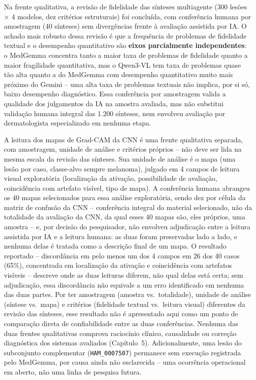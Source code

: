 Na frente qualitativa, a revisão de fidelidade das sínteses multiagente (300 lesões $\times$ 4 modelos, dez critérios estruturais) foi concluída, com conferência humana por amostragem (40 sínteses) sem divergências frente à avaliação assistida por IA. O achado mais robusto dessa revisão é que a frequência de problemas de fidelidade textual e o desempenho quantitativo são \textbf{eixos parcialmente independentes}: o MedGemma concentra tanto a maior taxa de problemas de fidelidade quanto a maior fragilidade quantitativa, mas o Qwen3-VL tem taxa de problemas quase tão alta quanto a do MedGemma com desempenho quantitativo muito mais próximo do Gemini -- uma alta taxa de problemas textuais não implica, por si só, baixo desempenho diagnóstico. Essa conferência por amostragem valida a qualidade dos julgamentos da IA na amostra avaliada, mas não substitui validação humana integral das 1.200 sínteses, nem envolveu avaliação por dermatologista especializado em nenhuma etapa.

A leitura dos mapas de Grad-CAM da CNN é uma frente qualitativa separada, com amostragem, unidade de análise e critérios próprios -- não deve ser lida na mesma escala da revisão das sínteses. Sua unidade de análise é o mapa (uma lesão por caso, classe-alvo sempre melanoma), julgado em 4 campos de leitura visual exploratória (localização da ativação, possibilidade de avaliação, coincidência com artefato visível, tipo de mapa). A conferência humana abrangeu os 40 mapas selecionados para essa análise exploratória, sendo dez por célula da matriz de confusão da CNN -- conferência integral do material selecionado, não da totalidade da avaliação da CNN, da qual esses 40 mapas são, eles próprios, uma amostra -- e, por decisão do pesquisador, não envolveu adjudicação entre a leitura assistida por IA e a leitura humana: as duas foram preservadas lado a lado, e nenhuma delas é tratada como a descrição final de um mapa. O resultado reportado -- discordância em pelo menos um dos 4 campos em 26 dos 40 casos (65\%), concentrada em localização da ativação e coincidência com artefatos visíveis -- descreve onde as duas leituras diferem, não qual delas está certa; sem adjudicação, essa discordância não equivale a um erro identificado em nenhuma das duas partes. Por ter amostragem (amostra vs.\ totalidade), unidade de análise (síntese vs.\ mapa) e critérios (fidelidade textual vs.\ leitura visual) diferentes da revisão das sínteses, esse resultado não é apresentado aqui como um ponto de comparação direta de confiabilidade entre as duas conferências. Nenhuma das duas frentes qualitativas comprova raciocínio clínico, causalidade ou correção diagnóstica dos sistemas avaliados (Capítulo~5). Adicionalmente, uma lesão do subconjunto complementar (\texttt{HAM\_0007507}) permanece sem execução registrada pelo MedGemma, por causa ainda não esclarecida -- uma ocorrência operacional em aberto, não uma linha de pesquisa futura.

